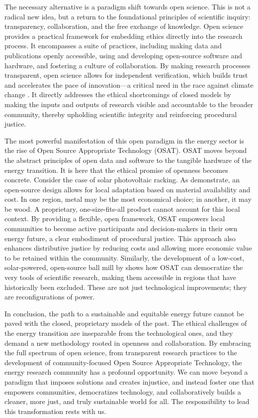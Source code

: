 \documentclass[12pt, letterpaper]{article}
\begin{document}
The necessary alternative is a paradigm shift towards open science. This is not a radical new idea, but a return to the foundational principles of scientific inquiry: transparency, collaboration, and the free exchange of knowledge. Open science provides a practical framework for embedding ethics directly into the research process. It encompasses a suite of practices, including making data and publications openly accessible, using and developing open-source software and hardware, and fostering a culture of collaboration. By making research processes transparent, open science allows for independent verification, which builds trust and accelerates the pace of innovation---a critical need in the race against climate change \citep{fell2024}. It directly addresses the ethical shortcomings of closed models by making the inputs and outputs of research visible and accountable to the broader community, thereby upholding scientific integrity and reinforcing procedural justice.

The most powerful manifestation of this open paradigm in the energy sector is the rise of Open Source Appropriate Technology (OSAT). OSAT moves beyond the abstract principles of open data and software to the tangible hardware of the energy transition. It is here that the ethical promise of openness becomes concrete. Consider the case of solar photovoltaic racking. As \citet{rana2023} demonstrate, an open-source design allows for local adaptation based on material availability and cost. In one region, metal may be the most economical choice; in another, it may be wood. A proprietary, one-size-fits-all product cannot account for this local context. By providing a flexible, open framework, OSAT empowers local communities to become active participants and decision-makers in their own energy future, a clear embodiment of procedural justice. This approach also enhances distributive justice by reducing costs and allowing more economic value to be retained within the community. Similarly, the development of a low-cost, solar-powered, open-source ball mill by \citet{mottaghi2023} shows how OSAT can democratize the very tools of scientific research, making them accessible in regions that have historically been excluded. These are not just technological improvements; they are reconfigurations of power.

In conclusion, the path to a sustainable and equitable energy future cannot be paved with the closed, proprietary models of the past. The ethical challenges of the energy transition are inseparable from the technological ones, and they demand a new methodology rooted in openness and collaboration. By embracing the full spectrum of open science, from transparent research practices to the development of community-focused Open Source Appropriate Technology, the energy research community has a profound opportunity. We can move beyond a paradigm that imposes solutions and creates injustice, and instead foster one that empowers communities, democratizes technology, and collaboratively builds a cleaner, more just, and truly sustainable world for all. The responsibility to lead this transformation rests with us.



\end{document}

